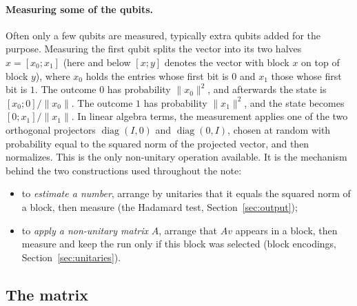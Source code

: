 \documentclass[11pt,a4paper]{article}
\begin{document}
\paragraph{Measuring some of the qubits.} Often only a few qubits are
measured, typically extra qubits added for the purpose. Measuring the
first qubit splits the vector into its two halves $x=[x_0;x_1]$ (here
and below $[x;y]$ denotes the vector with block $x$ on top of block $y$), where
$x_0$ holds the entries whose first bit is $0$ and $x_1$ those whose
first bit is $1$. The outcome $0$ has probability $\|x_0\|^2$, and
afterwards the state is $[x_0;0]/\|x_0\|$. The outcome $1$ has
probability $\|x_1\|^2$, and the state becomes $[0;x_1]/\|x_1\|$. In
linear algebra terms, the measurement applies one of the two orthogonal
projectors $\operatorname{diag}(I,0)$ and $\operatorname{diag}(0,I)$, chosen at
random with probability equal to the squared norm of the projected
vector, and then normalizes. This is the only non-unitary operation
available. It is the mechanism behind the two constructions used
throughout the note:
\begin{itemize}
\item to \emph{estimate a number}, arrange by unitaries that it equals the
  squared norm of a block, then measure (the Hadamard test,
  Section~\ref{sec:output});
\item to \emph{apply a non-unitary matrix} $A$, arrange that $Av$ appears
  in a block, then measure and keep the run only if this block was
  selected (block encodings, Section~\ref{sec:unitaries}).
\end{itemize}

\subsection{The matrix}\label{sec:matrix}
\end{document}

